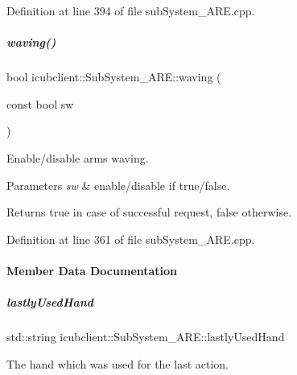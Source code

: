 Definition at line 394 of file sub\+System\+\_\+\+A\+R\+E.\+cpp.

\mbox{\label{group__icubclient__subsystems_a12374067510db0ffcd01bbea4e7b0ce1}} 
\subparagraph{\texorpdfstring{waving()}{waving()}}
{\footnotesize\ttfamily bool icubclient\+::\+Sub\+System\+\_\+\+A\+R\+E\+::waving (\begin{DoxyParamCaption}\item[{const bool}]{sw }\end{DoxyParamCaption})}



Enable/disable arms waving. 


\begin{DoxyParams}{Parameters}
{\em sw} & enable/disable if true/false. \\
\hline
\end{DoxyParams}
\begin{DoxyReturn}{Returns}
true in case of successful request, false otherwise. 
\end{DoxyReturn}


Definition at line 361 of file sub\+System\+\_\+\+A\+R\+E.\+cpp.



\paragraph{Member Data Documentation}
\mbox{\label{group__icubclient__subsystems_a3c405216a4f5b0c19e497c37902f7f84}} 
\subparagraph{\texorpdfstring{lastly\+Used\+Hand}{lastlyUsedHand}}
{\footnotesize\ttfamily std\+::string icubclient\+::\+Sub\+System\+\_\+\+A\+R\+E\+::lastly\+Used\+Hand\hspace{0.3cm}{\ttfamily [protected]}}



The hand which was used for the last action. 



